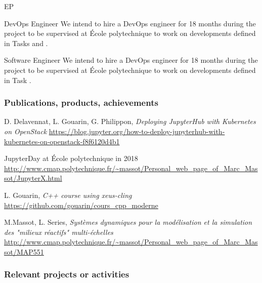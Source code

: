 \begin{sitedescription}{EP}





\begin{participant}[type=res,PM=18,salary=5500]{DevOps Engineer}
  We intend to hire a DevOps engineer for 18 months during the project to be supervised at \'Ecole polytechnique to work on developments defined in Tasks  and .
\end{participant}

\begin{participant}[type=res,PM=18,salary=5500]{Software Engineer}
  We intend to hire a DevOps engineer for 18 months during the project to be supervised at \'Ecole polytechnique to work on developments defined in Task .
\end{participant}

\subsubsection*{Publications, products, achievements}

\begin{compactenum}
\item D. Delavennat, L. Gouarin, G. Philippon, \emph{Deploying JupyterHub with Kubernetes on OpenStack} \newline
\url{https://blog.jupyter.org/how-to-deploy-jupyterhub-with-kubernetes-on-openstack-f8f6120d4b1}
\item JupyterDay at \'Ecole polytechnique in 2018 \newline
\url{http://www.cmap.polytechnique.fr/~massot/Personal_web_page_of_Marc_Massot/JupyterX.html}
\item L. Gouarin, \emph{C++ course using xeus-cling} \newline
\url{https://github.com/gouarin/cours_cpp_moderne}
\item M.Massot, L. Series, \emph{Systèmes dynamiques pour la modélisation et la simulation des "milieux réactifs" multi-échelles} \newline
\url{http://www.cmap.polytechnique.fr/~massot/Personal_web_page_of_Marc_Massot/MAP551}
\end{compactenum}

\subsubsection*{Relevant projects or activities}


\end{sitedescription}
